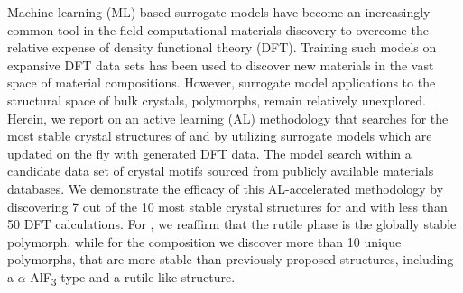 %



%
Machine learning (ML) based surrogate models have become an increasingly common tool in the field computational materials discovery to overcome the relative expense of  density functional theory (DFT).
%
Training such models on expansive DFT data sets has been used to discover new materials in the vast space of material compositions. However, surrogate model applications to the structural space of bulk crystals,  polymorphs, remain relatively unexplored.
%
%
Herein, we report on an active learning (AL) methodology that searches for the most stable crystal structures of \IrOtwo and \IrOthree by utilizing surrogate models which are updated on the fly with generated DFT data. The model search within a candidate data set of crystal motifs sourced from publicly available materials databases.
We demonstrate the efficacy of this AL-accelerated methodology by discovering 7 out of the 10 most stable crystal structures for \IrOtwo and \IrOthree with less than 50 DFT calculations.
%
For \IrOtwo, we reaffirm that the rutile phase is the globally stable polymorph,
while for the \IrOthree composition we discover more than 10 unique polymorphs, that are more stable than previously proposed structures, including a $\alpha$-AlF\textsubscript{3} type and a rutile-like \IrOthree structure.
%
